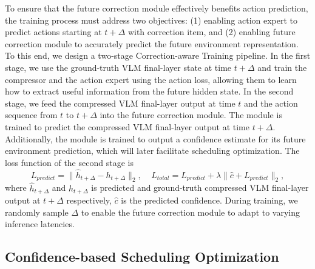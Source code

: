 To ensure that the future correction module effectively benefits action prediction, the training process must address two objectives: (1) enabling action expert to predict actions starting at $t+\Delta$ with correction item, and (2) enabling future correction module to accurately predict the future environment representation. To this end, we design a two-stage Correction-aware Training pipeline.
In the first stage, we use the ground-truth VLM final-layer state at time $t+\Delta$ and train the compressor and the action expert using the action loss, allowing them to learn how to extract useful information from the future hidden state.
In the second stage, we feed the compressed VLM final-layer output at time $t$ and the action sequence from $t$ to $t+\Delta$ into the future correction module. The module is trained to predict the compressed VLM final-layer output at time $t+\Delta$. Additionally, the module is trained to output a confidence estimate for its future environment prediction, which will later facilitate scheduling optimization. 
The loss function of the second stage is
\begin{equation}
\label{equ:2_stage_loss}
L_{predict} = \| \hat{h}_{t+\Delta} - h_{t+\Delta} \|_2,~~~~~ L_{total} = L_{predict} + \lambda \| \hat{c} + L_{predict} \|_2,
\end{equation}
where $\hat{h}_{t+\Delta}$ and $ h_{t+\Delta}$ is predicted and ground-truth compressed VLM final-layer output at $t+\Delta$ respectively, $\hat{c}$ is the predicted confidence. During training, we randomly sample $\Delta$ to enable the future correction module to adapt to varying inference latencies.




\subsection{Confidence-based Scheduling Optimization}

